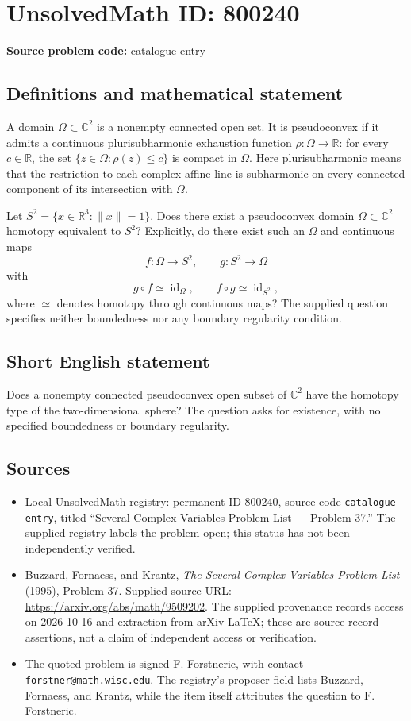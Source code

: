 \documentclass[11pt]{article}
\newcommand{\R}{\mathbb{R}}
\newcommand{\C}{\mathbb{C}}
\begin{document}
\section*{UnsolvedMath ID: 800240}
\textbf{Source problem code:} catalogue entry
\subsection{Definitions and mathematical statement}
A domain \(\Omega\subset\C^2\) is a nonempty connected open set. It is pseudoconvex if it admits a continuous plurisubharmonic exhaustion function \(\rho:\Omega\to\R\): for every \(c\in\R\), the set \(\{z\in\Omega:\rho(z)\le c\}\) is compact in \(\Omega\). Here plurisubharmonic means that the restriction to each complex affine line is subharmonic on every connected component of its intersection with \(\Omega\).

Let \(S^2=\{x\in\R^3:\|x\|=1\}\). Does there exist a pseudoconvex domain \(\Omega\subset\C^2\) homotopy equivalent to \(S^2\)? Explicitly, do there exist such an \(\Omega\) and continuous maps
\[
f:\Omega\longrightarrow S^2,\qquad g:S^2\longrightarrow\Omega
\]
with
\[
g\circ f\simeq\operatorname{id}_{\Omega},\qquad f\circ g\simeq\operatorname{id}_{S^2},
\]
where \(\simeq\) denotes homotopy through continuous maps? The supplied question specifies neither boundedness nor any boundary regularity condition.
\subsection{Short English statement}
Does a nonempty connected pseudoconvex open subset of \(\C^2\) have the homotopy type of the two-dimensional sphere? The question asks for existence, with no specified boundedness or boundary regularity.
\subsection{Sources}
\begin{itemize}
\item Local UnsolvedMath registry: permanent ID \(800240\), source code \texttt{catalogue entry}, titled ``Several Complex Variables Problem List --- Problem 37.'' The supplied registry labels the problem open; this status has not been independently verified.
\item Buzzard, Fornaess, and Krantz, \emph{The Several Complex Variables Problem List} (1995), Problem 37. Supplied source URL: \url{https://arxiv.org/abs/math/9509202}. The supplied provenance records access on 2026-10-16 and extraction from arXiv LaTeX; these are source-record assertions, not a claim of independent access or verification.
\item The quoted problem is signed F. Forstneric, with contact \texttt{forstner@math.wisc.edu}. The registry's proposer field lists Buzzard, Fornaess, and Krantz, while the item itself attributes the question to F. Forstneric.
\end{itemize}
\end{document}
